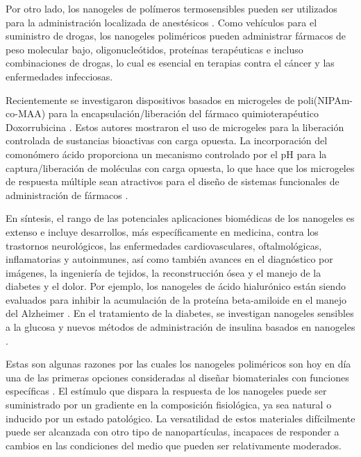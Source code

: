 Por otro lado, los nanogeles de pol\'imeros termosensibles pueden ser utilizados para la administraci\'on localizada de anest\'esicos \cite{indulekha2016thermoresponsive} . Como veh\'iculos para el suministro de drogas, los nanogeles polim\'ericos pueden administrar f\'armacos de peso molecular bajo, oligonucle\'otidos, prote\'inas terap\'euticas e incluso combinaciones de drogas, lo cual es esencial en terapias contra el c\'ancer y las enfermedades infecciosas.

Recientemente se investigaron dispositivos basados en microgeles de poli(NIPAm-co-MAA) para la encapsulaci\'on/liberaci\'on del f\'armaco quimioterap\'eutico Doxorrubicina \cite{Giussi2020, MartinezMoro2020, Pergushov2020}. Estos autores mostraron el uso de microgeles para la liberaci\'on controlada de sustancias bioactivas con carga opuesta.
La incorporaci\'on del comon\'omero \'acido proporciona un mecanismo controlado por el pH para la captura/liberaci\'on de mol\'eculas con carga opuesta, lo que hace que los microgeles de respuesta múltiple sean atractivos para el dise\~no de sistemas funcionales de administraci\'on de f\'armacos \cite{Liu2017}.

En s\'intesis, el rango de las potenciales aplicaciones biom\'edicas de los nanogeles es extenso e incluye desarrollos, m\'as espec\'ificamente en medicina, contra los trastornos neurol\'ogicos, las enfermedades cardiovasculares, oftalmol\'ogicas, inflamatorias y autoinmunes, as\'i como tambi\'en avances en el diagn\'ostico por im\'agenes, la ingenier\'ia de tejidos, la reconstrucci\'on \'osea y el manejo de la diabetes y el dolor. Por ejemplo, los nanogeles de \'acido hialur\'onico est\'an siendo evaluados para inhibir la acumulaci\'on de la prote\'ina beta-amiloide en el manejo del Alzheimer \cite{jiang2018nanogels}. En el tratamiento de la diabetes, se investigan nanogeles sensibles a la glucosa \cite{wu2010multifunctional} y nuevos m\'etodos de administraci\'on de insulina basados en nanogeles \cite{nolan2004thermally}.

Estas son algunas razones por las cuales los nanogeles polim\'ericos son hoy en d\'ia una de las primeras opciones consideradas al dise\~nar biomateriales con funciones espec\'ificas \cite{soni2016nanogels,sabir2019polymeric}. El est\'imulo que dispara la respuesta de los nanogeles puede ser suministrado por un gradiente en la composici\'on fisiol\'ogica, ya sea natural o inducido por un estado patol\'ogico. La versatilidad de estos materiales dif\'icilmente puede ser alcanzada con otro tipo de nanopart\'iculas, incapaces de responder a cambios en las condiciones del medio que pueden ser relativamente moderados.

